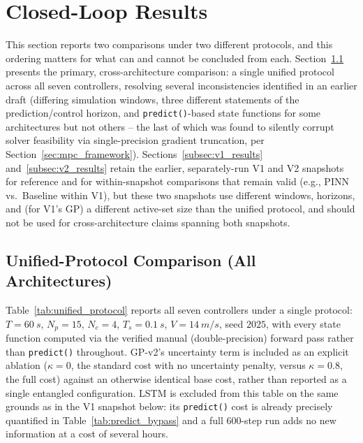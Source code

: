
\section{Closed-Loop Results}
\label{sec:closed_loop_results}

This section reports two comparisons under two different protocols,
and this ordering matters for what can and cannot be concluded from
each. Section~\ref{subsec:unified_protocol} presents the primary,
cross-architecture comparison: a single unified protocol across all
seven controllers, resolving several inconsistencies identified in an
earlier draft (differing simulation windows, three different
statements of the prediction/control horizon, and
\texttt{predict()}-based state functions for some architectures but
not others -- the last of which was found to silently corrupt solver
feasibility via single-precision gradient truncation, per
Section~\ref{sec:mpc_framework}). Sections~\ref{subsec:v1_results}
and~\ref{subsec:v2_results} retain the earlier, separately-run V1 and
V2 snapshots for reference and for within-snapshot comparisons that
remain valid (e.g., PINN vs.\ Baseline within V1), but these two
snapshots use different windows, horizons, and (for V1's GP) a
different active-set size than the unified protocol, and should not
be used for cross-architecture claims spanning both snapshots.

\subsection{Unified-Protocol Comparison (All Architectures)}
\label{subsec:unified_protocol}

\hspace{1.5cm} Table~\ref{tab:unified_protocol} reports all seven controllers under a
single protocol: $T=\SI{60}{s}$, $N_p=15$, $N_c=4$, $T_s=\SI{0.1}{s}$,
$V=\SI{14}{m/s}$, seed $2025$, with every state function computed via
the verified manual (double-precision) forward pass rather than
\texttt{predict()} throughout. GP-v2's uncertainty term is included as
an explicit ablation ($\kappa=0$, the standard cost with no
uncertainty penalty, versus $\kappa=0.8$, the full cost) against an
otherwise identical base cost, rather than reported as a single
entangled configuration. LSTM is excluded from this table on the same
grounds as in the V1 snapshot below: its \texttt{predict()} cost is
already precisely quantified in Table~\ref{tab:predict_bypass} and a
full 600-step run adds no new information at a cost of several hours.

